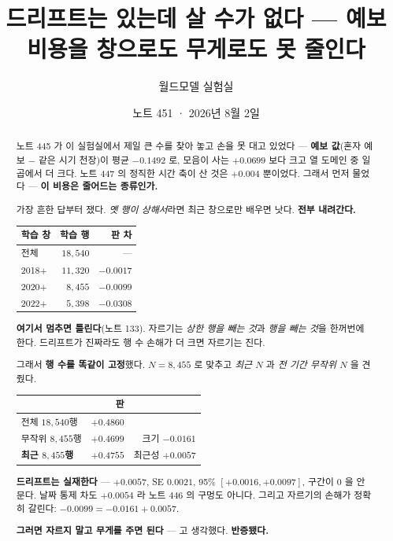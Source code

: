 \documentclass[11pt]{article}
\begin{document}
\title{드리프트는 있는데 살 수가 없다 --- 예보 비용을 창으로도 무게로도
못 줄인다}
\author{월드모델 실험실}
\date{노트 451 · 2026년 8월 2일}
\maketitle

\begin{abstract}
노트 445 가 이 실험실에서 제일 큰 수를 찾아 놓고 손을 못 대고 있었다 ---
\textbf{예보 값}(혼자 예보 $-$ 같은 시기 천장)이 평균 $-0.1492$ 로, 모음이
사는 $+0.0699$ 보다 크고 열 도메인 중 일곱에서 더 크다. 노트 447 의
정직한 시간 축이 산 것은 $+0.004$ 뿐이었다. 그래서 먼저 물었다 ---
\textbf{이 비용은 줄어드는 종류인가.}

가장 흔한 답부터 쟀다. \emph{옛 행이 상해서}라면 최근 창으로만 배우면
낫다. \textbf{전부 내려간다.}

\begin{center}
\begin{tabular}{lrr}
\hline
학습 창 & 학습 행 & 판 차 \\
\hline
전체 & $18{,}540$ & --- \\
2018$+$ & $11{,}320$ & $-0.0017$ \\
2020$+$ & $8{,}455$ & $-0.0099$ \\
2022$+$ & $5{,}398$ & $-0.0308$ \\
\hline
\end{tabular}
\end{center}

\textbf{여기서 멈추면 틀린다}(노트 133). 자르기는 \emph{상한 행을 빼는
것}과 \emph{행을 빼는 것}을 한꺼번에 한다. 드리프트가 진짜라도 행 수
손해가 더 크면 자르기는 진다.

그래서 \textbf{행 수를 똑같이 고정}했다. $N = 8{,}455$ 로 맞추고
\emph{최근 $N$} 과 \emph{전 기간 무작위 $N$} 을 견줬다.

\begin{center}
\begin{tabular}{lrr}
\hline
 & 판 & \\
\hline
전체 $18{,}540$행 & $+0.4860$ & \\
무작위 $8{,}455$행 & $+0.4699$ & 크기 $\mathbf{-0.0161}$ \\
\textbf{최근 $8{,}455$행} & $+0.4755$ & 최근성 $\mathbf{+0.0057}$ \\
\hline
\end{tabular}
\end{center}

\textbf{드리프트는 실재한다} --- $+0.0057$, SE $0.0021$, 95\%
$[+0.0016, +0.0097]$, 구간이 $0$ 을 안 문다. 날짜 통제 차도 $+0.0054$ 라
노트 446 의 구멍도 아니다. 그리고 자르기의 손해가 정확히 갈린다:
$\mathbf{-0.0099 = -0.0161 + 0.0057}$.

\textbf{그러면 자르지 말고 무게를 주면 된다} --- 고 생각했다.
\textbf{반증됐다.}
\end{abstract}
\end{document}
